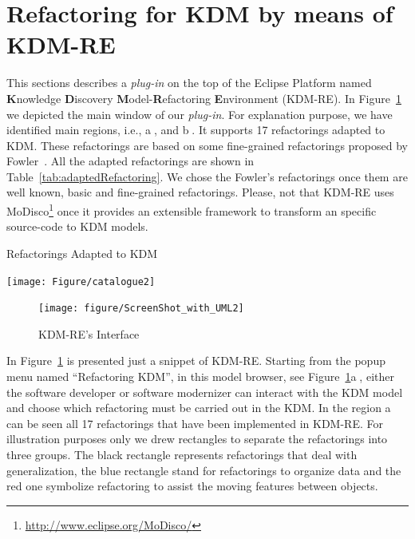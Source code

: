 \documentclass[12pt]{article}
\let\cite=\citep
\begin{document}

\section{Refactoring for KDM by means of KDM-RE}\label{sec:refactoring_kdm_kdm_re}

This sections describes a \textit{plug-in} on the top of the Eclipse Platform named \textbf{K}nowledge \textbf{D}iscovery \textbf{M}odel-\textbf{R}efactoring \textbf{E}nvironment (KDM-RE). 
In Figure~\ref{fig:interface} we depicted the main window of our \textit{plug-in}. 
For explanation purpose, we have identified main regions, i.e., \textcircled{a}, and \textcircled{b}.
It supports 17 refactorings adapted to KDM. These refactorings are based on some fine-grained refactorings proposed by Fowler~\cite{refactImpro}. All the adapted refactorings are shown in Table~\ref{tab:adaptedRefactoring}. We chose the Fowler's refactorings once them are well known, basic and fine-grained refactorings. Please, not that KDM-RE uses MoDisco\footnote{\url{http://www.eclipse.org/MoDisco/}} once it provides an extensible framework to transform an specific source-code to KDM models.


\begin{table}[!h]
\caption{Refactorings Adapted to KDM}
\label{tab:adaptedRefactoring}
\centering
  \texttt{[image: Figure/catalogue2]}
\end{table}

\begin{figure}[!ht]
\centering
  \texttt{[image: figure/ScreenShot\_with\_UML2]}
\caption{KDM-RE's Interface}
\label{fig:interface}
\end{figure}
 

In Figure~\ref{fig:interface} is presented just a snippet of KDM-RE. Starting from the popup menu named ``Refactoring KDM'', in this model browser, see Figure~\ref{fig:interface}\textcircled{a}, either the software developer or software modernizer can interact with the KDM model and choose which refactoring must be carried out in the KDM.
%
In the region \textcircled{a} can be seen all 17 refactorings that have been implemented in KDM-RE. 
For illustration purposes only we drew rectangles to separate the refactorings into three groups. 
The black rectangle represents refactorings that deal with generalization, the blue rectangle stand for refactorings to organize data and the red one symbolize refactoring to assist the moving features between objects.
\end{document}
